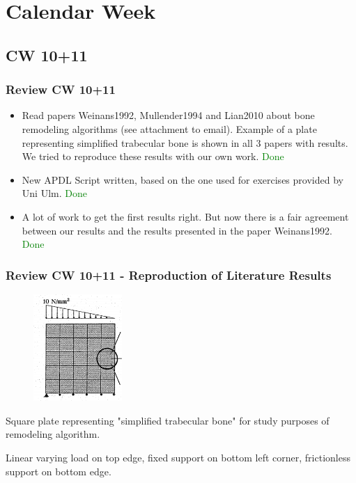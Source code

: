 \section{Calendar Week}
\subsection{CW 10+11}
\begin{frame}
  \frametitle{Review CW 10+11}
	\begin{itemize}
		\item Read papers Weinans1992, Mullender1994 and Lian2010 about bone remodeling algorithms (see attachment to email). Example of a plate representing simplified trabecular bone is shown in all 3 papers with results. We tried to reproduce these results with our own work. \textcolor{green}{Done}
		\item New APDL Script written, based on the one used for exercises provided by Uni Ulm. \textcolor{green}{Done}
		\item A lot of work to get the first results right. But now there is a fair agreement between our results and the results presented in the paper Weinans1992. \textcolor{green}{Done}
	\end{itemize}
\end{frame}

\begin{frame}
  \frametitle{Review CW 10+11 - Reproduction of Literature Results}
	\begin{figure}
		\includegraphics[width=0.3\textwidth]{pictures/2022_CW10+11_1}
	\end{figure}
	\centering Square plate representing "simplified trabecular bone" for study purposes of remodeling algorithm. 
	
	\centering Linear varying load on top edge, fixed support on bottom left corner, frictionless support on bottom edge. 
\end{frame}

